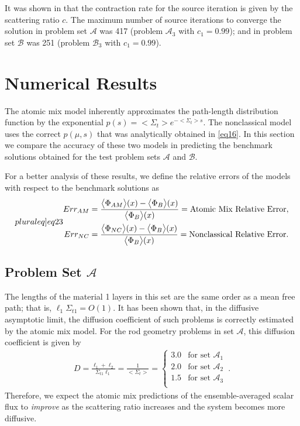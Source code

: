 \documentclass[12pt]{article}
\newcommand{\bl}{\big<}
\newcommand{\bg}{\big>}
\newcommand{\seta}{\mathcal{A}}
\newcommand{\setb}{\mathcal{B}}
\begin{document}
{It was shown in \cite{kry13} that the contraction rate for the source iteration is given by the scattering ratio $c$.
The maximum number of source iterations to converge the solution in problem set $\seta$ was 417 (problem $\seta_3$ with $c_1=0.99$); and in problem set $\setb$ was 251 (problem $\setb_3$ with $c_1=0.99$).

\section{Numerical Results}\label{sec5}

The atomic mix model inherently approximates the path-length distribution function by the exponential $p(s) = \bl\Sigma_t\bg e^{-\bl\Sigma_t\bg s}$.
The nonclassical model uses the correct $p(\mu,s)$ that was analytically obtained in \cref{eq16}.
In this section we compare the accuracy of these two models in predicting the benchmark solutions obtained for the test problem sets $\seta$ and $\setb$. 

For a better analysis of these results, we define the relative errors of the models with respect to the benchmark solutions as
\begin{subequations}\label[pluraleq]{eq23}
\begin{align}
 Err_{AM}&= \frac{\bl\Phi_{AM}\bg(x)-\bl\Phi_B\bg(x)}{\bl\Phi_B\bg(x)}=\text{Atomic Mix Relative Error},\\
 Err_{NC}&= \frac{\bl\Phi_{NC}\bg(x)-\bl\Phi_B\bg(x)}{\bl\Phi_B\bg(x)}=\text{Nonclassical Relative Error}.
\end{align}
\end{subequations}

\subsection{Problem Set $\seta$}

The lengths of the material 1 layers in this set are the same order as a mean free path; that is, $\ell_1\Sigma_{t1} = O(1)$.
It has been shown \cite{larvas05} that, in the diffusive asymptotic limit, the diffusion coefficient of such problems is correctly estimated by the atomic mix model.
For the rod geometry problems in set $\seta$, this diffusion coefficient is given by
\begin{align}\label{eq24}
D = \frac{\ell_1+\ell_2}{\Sigma_{t1}\ell_1} = \frac{1}{\bl\Sigma_t\bg} =
\left\{
\begin{array}{cl}
3.0 & \text{for set $\seta_1$}\\
2.0 & \text{for set $\seta_2$}\\
1.5 & \text{for set $\seta_3$}\\
\end{array}
\right . \, .
\end{align}  
Therefore, we expect the atomic mix predictions of the ensemble-averaged scalar flux to {\em improve} as the scattering ratio increases and the system becomes more diffusive.

}
\end{document}
